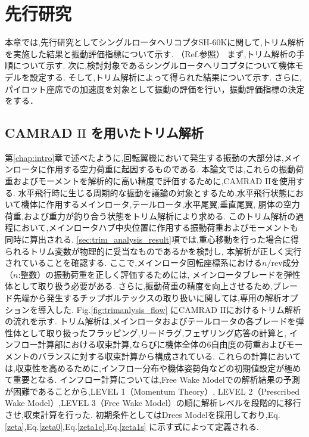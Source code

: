 \appendix
\chapter{先行研究}
\label{chap:previous_research}
\begin{flushright}
	\begin{minipage}{0.8\hsize}
		\quad 本章では,先行研究としてシングルロータヘリコプタSH-60Kに関して,トリム解析を実施した結果と振動評価指標について示す.
             （Ref.\cite{Yoshizaki_master}参照）
		    まず,トリム解析の手順について示す.
            次に,検討対象であるシングルロータヘリコプタについて機体モデルを設定する.
            そして,トリム解析によって得られた結果について示す.
            さらに,パイロット座席での加速度を対象として振動の評価を行い，振動評価指標の決定をする．
	\end{minipage}
\end{flushright}
    \section{CAMRAD $\mathrm{II}$ を用いたトリム解析}
    \label{sec:trim_analysis}
    
    \par
    第\ref{chap:intro}章で述べたように,回転翼機において発生する振動の大部分は,メインロータに作用する空力荷重に起因するものである.
    本論文では,これらの振動荷重およびモーメントを解析的に高い精度で評価するために,CAMRAD $\mathrm{II}$を使用する.
    水平飛行時に生じる周期的な振動を議論の対象とするため,水平飛行状態において機体に作用するメインロータ,テールロータ,水平尾翼,垂直尾翼,
    胴体の空力荷重,および重力が釣り合う状態をトリム解析により求める.
    このトリム解析の過程において,メインロータハブ中央位置に作用する振動荷重およびモーメントも同時に算出される.
    \ref{sec:trim_analysis_result}項では,重心移動を行った場合に得られるトリム変数が物理的に妥当なものであるかを検討し,
    本解析が正しく実行されていることを確認する. 
    ここで,メインロータ回転座標系における$n/\mathrm{rev}$成分（$n$:整数）の振動荷重を正しく評価するためには,
    メインロータブレードを弾性体として取り扱う必要がある.
    さらに,振動荷重の精度を向上させるため,ブレード先端から発生するチップボルテックスの取り扱いに関しては,専用の解析オプションを導入した.
    Fig.\ref{fig:trimanlysis_flow} にCAMRAD $\mathrm{II}$におけるトリム解析の流れを示す.
    トリム解析は,メインロータおよびテールロータの各ブレードを弾性体として取り扱ったフラッピング,リードラグ,フェザリング応答の計算と,
    インフロー計算部における収束計算,ならびに機体全体の6自由度の荷重およびモーメントのバランスに対する収束計算から構成されている.
    これらの計算においては,収束性を高めるために,インフロー分布や機体姿勢角などの初期値設定が極めて重要となる.
    インフロー計算については,Free Wake Modelでの解析結果の予測が困難であることから,LEVEL 1（Momentum Theory）,
    LEVEL 2（Prescribed Wake Model）,LEVEL 3（Free Wake Model）の順に解析レベルを段階的に移行させ,収束計算を行った.
    初期条件としてはDrees Modelを採用しており,Eq.\ref{zeta},Eq.\ref{zeta0},Eq.\ref{zeta1c},Eq.\ref{zeta1s} に示す式によって定義される.

